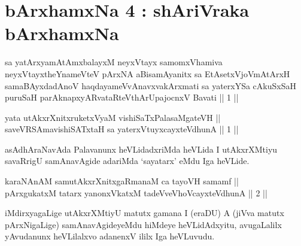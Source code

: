 

\chapter{bArxhamxNa 4 : shAriVraka bArxhamxNa}


\begin{kandikeshl}
sa yatArxyamAtAmxbalayxM neyxVtayx samomxVhamiva neyxVtayxtheYnameVteV pArxNA aBisamAyanitx sa EtAsetxVjoVmAtArxH samaBAyxdadAnoV haqdayameVvAnavxvakArxmati sa yaterxYSa cAkuSxSaH puruSaH parAknapxyARvataRteV\s thArUpajocnxV Bavati || 1 ||
\end{kandikeshl}



\begin{shl}
yata utAkxrXnitxruketxVyaM vishiSaTxPalasaMgateVH || \\
saveVRSAmavishiSATx\s taH sa yaterxVtuyxcayxteV\s dhunA \hfill || 1 ||
  
\end{shl}

\begin{artha}
asAdhAraNavAda Palavanunx heVLidadxriMda heVLida I utAkxrXMtiyu
savaRrigU samAnavAgide adariMda `sayatarx' eMdu Iga heVLide.
\end{artha}


\begin{shl}
karaNAnAM samutAkxrXnitxgaRmanaM ca tayoVH samamf || \\
pArxgukatxM tatarx yanonxVkatxM tadeVveVhoVcayxteV\s dhunA \hfill || 2 ||
  
\end{shl}

\begin{artha}
iMdirxyagaLige utAkxrXMtiyU matutx gamana I (eraDU) A (jiVva matutx
pArxNigaLige) samAnavAgideyeMdu hiMdeye heVLidAdxyitu, avugaLalilx
yAvudanunx heVLilalxvo adanenxV ililx Iga heVLuvudu.
\end{artha}

